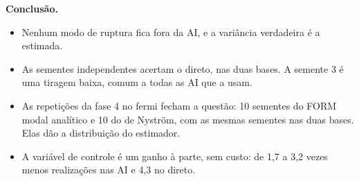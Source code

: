 \documentclass[11pt,a4paper]{article}
\begin{document}
\textbf{Conclusão.}
\begin{itemize}
  \item Nenhum modo de ruptura fica fora da AI, e a variância verdadeira é a estimada.
  \item As sementes independentes acertam o direto, nas duas bases. A semente 3 é uma tiragem baixa, comum a todas as
    AI que a usam.
  \item As repetições da fase 4 no fermi fecham a questão: 10 sementes do FORM modal analítico e 10 do de Nyström, com as
    mesmas sementes nas duas bases. Elas dão a distribuição do estimador.
  \item A variável de controle é um ganho à parte, sem custo: de 1{,}7 a 3{,}2 vezes menos realizações nas AI e 4{,}3 no direto.
\end{itemize}
\end{document}
